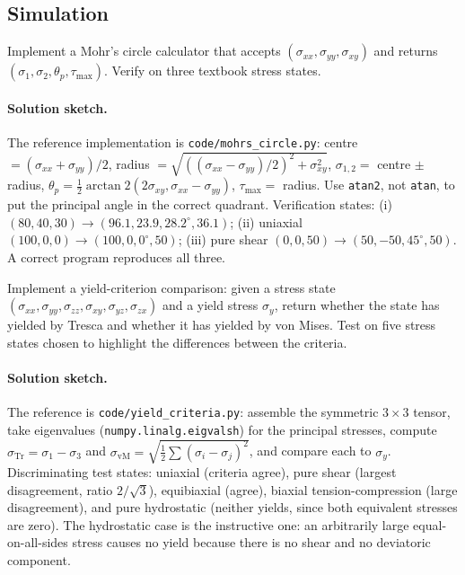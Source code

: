 \subsection*{Simulation}

\begin{exercise}
Implement a Mohr's circle calculator that accepts $(\sigma_{xx},
\sigma_{yy}, \sigma_{xy})$ and returns $(\sigma_1, \sigma_2, \theta_p,
\tau_{\max})$. Verify on three textbook stress states.
\paragraph{Solution sketch.} The reference implementation is
\texttt{code/mohrs\_circle.py}: centre $= (\sigma_{xx}+\sigma_{yy})/2$,
radius $= \sqrt{((\sigma_{xx}-\sigma_{yy})/2)^2 + \sigma_{xy}^2}$,
$\sigma_{1,2} = $ centre $\pm$ radius, $\theta_p =
\tfrac{1}{2}\arctan2(2\sigma_{xy}, \sigma_{xx}-\sigma_{yy})$,
$\tau_{\max} = $ radius. Use \texttt{atan2}, not \texttt{atan}, to put
the principal angle in the correct quadrant. Verification states:
(i) $(80,40,30)\to(96.1, 23.9, 28.2^{\circ}, 36.1)$; (ii) uniaxial
$(100,0,0)\to(100, 0, 0^{\circ}, 50)$; (iii) pure shear $(0,0,50)\to
(50, -50, 45^{\circ}, 50)$. A correct program reproduces all three.
\end{exercise}

\begin{exercise}
Implement a yield-criterion comparison: given a stress state
$(\sigma_{xx}, \sigma_{yy}, \sigma_{zz}, \sigma_{xy}, \sigma_{yz},
\sigma_{zx})$ and a yield stress $\sigma_y$, return whether the
state has yielded by Tresca and whether it has yielded by von Mises.
Test on five stress states chosen to highlight the differences
between the criteria.
\paragraph{Solution sketch.} The reference is
\texttt{code/yield\_criteria.py}: assemble the symmetric $3\times 3$
tensor, take eigenvalues (\texttt{numpy.linalg.eigvalsh}) for the
principal stresses, compute $\sigma_{\text{Tr}} = \sigma_1 - \sigma_3$
and $\sigma_{\text{vM}} = \sqrt{\tfrac{1}{2}\sum(\sigma_i-\sigma_j)^2}$,
and compare each to $\sigma_y$. Discriminating test states: uniaxial
(criteria agree), pure shear (largest disagreement, ratio $2/\sqrt3$),
equibiaxial (agree), biaxial tension-compression (large disagreement),
and pure hydrostatic (neither yields, since both equivalent stresses
are zero). The hydrostatic case is the instructive one: an arbitrarily
large equal-on-all-sides stress causes no yield because there is no
shear and no deviatoric component.
\end{exercise}

